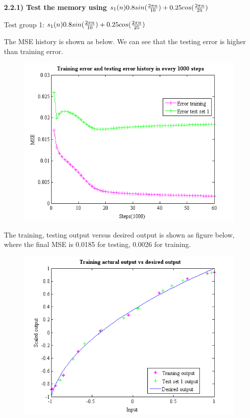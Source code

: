 \documentclass[epsfig]{article}
\def\bpar{\vskip26pt}
\def\npar{\vskip13pt}
\begin{document}
\clearpage

{\bf 
\npar
2.2.1) Test the memory using $s_1{(n)}0.8sin({2\pi n \over 10}) + 0.25cos({2\pi n \over 25})$

\bpar
}

Test group 1: $s_1{(n)}0.8sin({2\pi n \over 10}) + 0.25cos({2\pi n \over 25})$

The MSE history is shown as below. We can see that the testing error is higher than training error.

\begin{figure}[!htb] 
\centering\includegraphics[width=4.5in]{err_test1.png} 
\end{figure} 

The training, testing output versus desired output is shown as figure below, where the final MSE is 0.0185 for testing, 0.0026 for training.

\begin{figure}[!htb] 
\centering\includegraphics[width=4.5in]{output_test1.png} 
\end{figure} 
\end{document}
